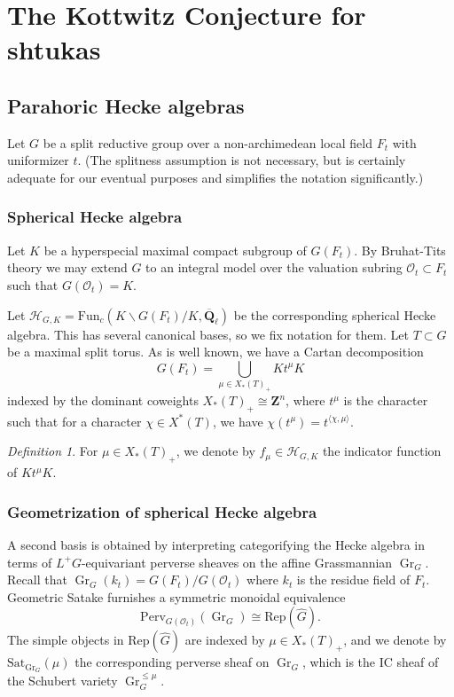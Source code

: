 \documentclass[reqno]{amsart}
\numberwithin{equation}{section}
\newcommand{\Q}{\mathbf{Q}}
\newcommand{\Z}{\mathbf{Z}}
\newcommand{\ol}[1]{\overline{#1}}
\newcommand{\wh}[1]{\widehat{#1}}
\newcommand{\Cal}[1]{\mathcal{#1}}
\newcommand{\mrm}[1]{\mathrm{#1}}
\newcommand{\bs}{\backslash}
\DeclareMathOperator{\Gr}{Gr}
\theoremstyle{remark}
\newtheorem{defn}[thm]{Definition}
\numberwithin{equation}{section}
\begin{document}
\section{The Kottwitz Conjecture for shtukas} \label{kottwitz for shtukas}

 
\subsection{Parahoric Hecke algebras}\label{parahoric HA}

Let $G$ be a split reductive group over a non-archimedean local field $F_t$ with uniformizer $t$. (The splitness assumption is not necessary, but is certainly adequate for our eventual purposes and simplifies the notation significantly.) 


\subsubsection{Spherical Hecke algebra}
Let $K$ be a hyperspecial maximal compact subgroup of $G(F_t)$. By Bruhat-Tits theory we may extend $G$ to an integral model over the valuation subring $\Cal{O}_t \subset F_t$ such that $G(\Cal{O}_t) = K$. 

Let $\Cal{H}_{G,K}  = \mrm{Fun}_c(K \bs G(F_t) / K , \ol{\Q}_{\ell})$ be the corresponding spherical Hecke algebra. This has several canonical bases, so we fix notation for them. Let $T \subset G$ be a maximal split torus. As is well known, we have a Cartan decomposition 
\begin{equation}\label{eq: cartan decomp}
G(F_t) = \bigcup_{\mu \in X_*(T)_+} K t^{\mu} K 
\end{equation}
indexed by the dominant coweights $X_*(T)_+ \cong \Z^n$, where $t^{\mu}$ is the character such that for a character $\chi \in X^*(T)$, we have $\chi(t^{\mu})  = t^{\langle \chi, \mu \rangle}$. 

\begin{defn}\label{defn: hecke function double coset}
For $\mu \in X_*(T)_+$, we denote by $f_{\mu} \in \Cal{H}_{G,K}$ the indicator function of $K t^{\mu} K$.
\end{defn}



\subsubsection{Geometrization of spherical Hecke algebra}\label{sssec: geom spherical HA}
A second basis is obtained by interpreting categorifying the Hecke algebra in terms of $L^+ G$-equivariant perverse sheaves on the affine Grassmannian $\Gr_G$. Recall that $\Gr_G(k_t) =G(F_t)/G(\Cal{O}_t)$ where $k_t$ is the residue field of $F_t$. Geometric Satake furnishes a symmetric monoidal equivalence 
\[
\mrm{Perv}_{G(\Cal{O}_t)} (\Gr_G) \cong \mrm{Rep}(\wh{G}).
\]
The simple objects in $\mrm{Rep}(\wh{G})$ are indexed by $\mu \in X_*(T)_+$, and we denote by $\mrm{Sat}_{\Gr_G}(\mu)$ the corresponding perverse sheaf on $\Gr_G$, which is the IC sheaf of the Schubert variety $\Gr_G^{\leq\mu}$. 
\end{document}
